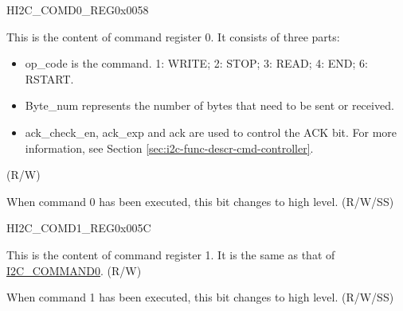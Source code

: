 \begin{register}{H}{I2C\_COMD0\_REG}{0x0058}\label{regdesc:I2CCOMD0REG}
%
%
%
\regnewline%
\begin{regdesc}\begin{reglist}
\label{fielddesc:I2CCOMMAND0}\item [I2C\_COMMAND0] This is the content of command register 0. It consists of three parts:
\begin{itemize}
    \item op\_code is the command. 1: WRITE; 2: STOP; 3: READ; 4: END; 6: RSTART.
    \item Byte\_num represents the number of bytes that need to be sent or received.
    \item ack\_check\_en, ack\_exp and ack are used to control the ACK bit. For more information, see Section \ref{sec:i2c-func-descr-cmd-controller}.
\end{itemize} (R/W)
\label{fielddesc:I2CCOMMAND0DONE}\item [I2C\_COMMAND0\_DONE] When command 0 has been executed, this bit changes to high level. (R/W/SS)
\end{reglist}\end{regdesc}
\end{register}


\begin{register}{H}{I2C\_COMD1\_REG}{0x005C}\label{regdesc:I2CCOMD1REG}
%
%
%
\regnewline%
\begin{regdesc}\begin{reglist}
\label{fielddesc:I2CCOMMAND1}\item [I2C\_COMMAND1] This is the content of command register 1. It is the same as that of \hyperref[fielddesc:I2CCOMMAND0]{I2C\_COMMAND0}. (R/W)
\label{fielddesc:I2CCOMMAND1DONE}\item [I2C\_COMMAND1\_DONE] When command 1 has been executed, this bit changes to high
level. (R/W/SS)
\end{reglist}\end{regdesc}
\end{register}


